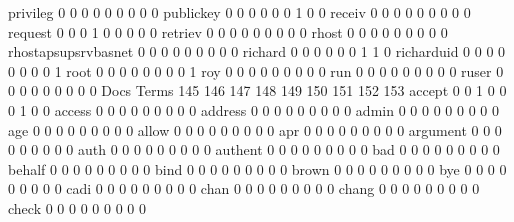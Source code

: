 \documentclass[compress,8pt]{beamer}
\begin{document}
\begin{frame}
\begin{Schunk}
  privileg                                   0   0   0   0   0   0   0   0   0
  publickey                                  0   0   0   0   0   0   1   0   0
  receiv                                     0   0   0   0   0   0   0   0   0
  request                                    0   0   0   1   0   0   0   0   0
  retriev                                    0   0   0   0   0   0   0   0   0
  rhost                                      0   0   0   0   0   0   0   0   0
  rhostapsupsrvbasnet                        0   0   0   0   0   0   0   0   0
  richard                                    0   0   0   0   0   0   1   1   0
  richarduid                                 0   0   0   0   0   0   0   0   1
  root                                       0   0   0   0   0   0   0   0   1
  roy                                        0   0   0   0   0   0   0   0   0
  run                                        0   0   0   0   0   0   0   0   0
  ruser                                      0   0   0   0   0   0   0   0   0
                                          Docs
Terms                                      145 146 147 148 149 150 151 152 153
  accept                                     0   0   1   0   0   0   1   0   0
  access                                     0   0   0   0   0   0   0   0   0
  address                                    0   0   0   0   0   0   0   0   0
  admin                                      0   0   0   0   0   0   0   0   0
  age                                        0   0   0   0   0   0   0   0   0
  allow                                      0   0   0   0   0   0   0   0   0
  apr                                        0   0   0   0   0   0   0   0   0
  argument                                   0   0   0   0   0   0   0   0   0
  auth                                       0   0   0   0   0   0   0   0   0
  authent                                    0   0   0   0   0   0   0   0   0
  bad                                        0   0   0   0   0   0   0   0   0
  behalf                                     0   0   0   0   0   0   0   0   0
  bind                                       0   0   0   0   0   0   0   0   0
  brown                                      0   0   0   0   0   0   0   0   0
  bye                                        0   0   0   0   0   0   0   0   0
  cadi                                       0   0   0   0   0   0   0   0   0
  chan                                       0   0   0   0   0   0   0   0   0
  chang                                      0   0   0   0   0   0   0   0   0
  check                                      0   0   0   0   0   0   0   0   0

\end{Schunk}
\end{frame}
\end{document}
